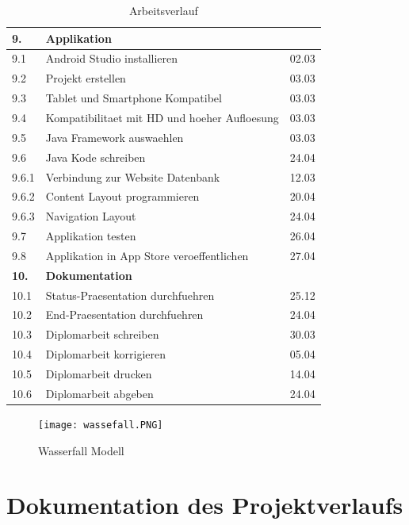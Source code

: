  \begin{table}
 \begin{center}
 \begin{tabular}{ |l|l|l| }
 \hline
 \textbf{9.} & \textbf{Applikation} &  \\ 
 \hline
 9.1 & Android Studio installieren & 02.03 \\
 \hline
 9.2 & Projekt erstellen & 03.03 \\
 \hline
 9.3 & Tablet und Smartphone Kompatibel & 03.03 \\
 \hline
 9.4 & Kompatibilitaet mit HD und hoeher Aufloesung & 03.03 \\
 \hline
 9.5 & Java Framework auswaehlen & 03.03 \\
 \hline
 9.6 & Java Kode schreiben & 24.04 \\
 \hline
 9.6.1 & Verbindung zur Website Datenbank & 12.03 \\
 \hline
 9.6.2 & Content Layout programmieren & 20.04 \\
 \hline
 9.6.3 & Navigation Layout & 24.04 \\
 \hline
 9.7 & Applikation testen & 26.04 \\
 \hline
 9.8 & Applikation in App Store veroeffentlichen & 27.04 \\
 \hline
 \textbf{10.} & \textbf{Dokumentation} &  \\ 
 \hline
 10.1 & Status-Praesentation durchfuehren & 25.12 \\
 \hline
 10.2 & End-Praesentation durchfuehren & 24.04 \\
 \hline
 10.3 & Diplomarbeit schreiben & 30.03 \\
 \hline
 10.4 & Diplomarbeit korrigieren & 05.04 \\
 \hline
 10.5 & Diplomarbeit drucken & 14.04 \\
 \hline
 10.6 & Diplomarbeit abgeben & 24.04 \\
 \hline 
\end{tabular}
\end{center}
\caption{Arbeitsverlauf}
\end{table}

\begin{landscape}
\begin{figure}
  \texttt{[image: wassefall.PNG]}
  \caption{Wasserfall Modell}
  \label{fig:wasserfallmodel}
\end{figure}

\end{landscape}


\chapter{Dokumentation des Projektverlaufs}


